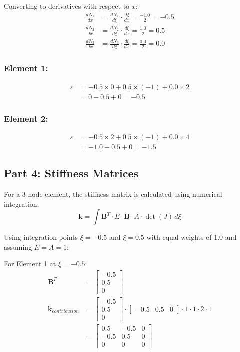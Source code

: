 \documentclass[12pt,a4paper]{article}
\begin{document}
Converting to derivatives with respect to $x$:
\begin{align}
\frac{dN_1}{dx} &= \frac{dN_1}{d\xi} \cdot \frac{d\xi}{dx} = \frac{-1.0}{2} = -0.5 \\
\frac{dN_2}{dx} &= \frac{dN_2}{d\xi} \cdot \frac{d\xi}{dx} = \frac{1.0}{2} = 0.5 \\
\frac{dN_3}{dx} &= \frac{dN_3}{d\xi} \cdot \frac{d\xi}{dx} = \frac{0.0}{2} = 0.0
\end{align}

\subsubsection*{Element 1:}
\begin{align}
\varepsilon &= -0.5 \times 0 + 0.5 \times (-1) + 0.0 \times 2 \\
&= 0 - 0.5 + 0 = -0.5
\end{align}

\subsubsection*{Element 2:}
\begin{align}
\varepsilon &= -0.5 \times 2 + 0.5 \times (-1) + 0.0 \times 4 \\
&= -1.0 - 0.5 + 0 = -1.5
\end{align}

\subsection{Part 4: Stiffness Matrices}
For a 3-node element, the stiffness matrix is calculated using numerical integration:
\begin{equation}
\mathbf{k} = \int\mathbf{B}^T \cdot E \cdot \mathbf{B} \cdot A \cdot \det(J) \, d\xi
\end{equation}

Using integration points $\xi = -0.5$ and $\xi = 0.5$ with equal weights of 1.0 and assuming $E = A = 1$:

For Element 1 at $\xi = -0.5$:
\begin{align}
\mathbf{B}^T &= \begin{bmatrix} -0.5 \\ 0.5 \\ 0 \end{bmatrix} \\
\mathbf{k}_{contribution} &= \begin{bmatrix} -0.5 \\ 0.5 \\ 0 \end{bmatrix} \cdot \begin{bmatrix} -0.5 & 0.5 & 0 \end{bmatrix} \cdot 1 \cdot 1 \cdot 2 \cdot 1 \\
&= \begin{bmatrix} 0.5 & -0.5 & 0 \\ -0.5 & 0.5 & 0 \\ 0 & 0 & 0 \end{bmatrix}
\end{align}
\end{document}
